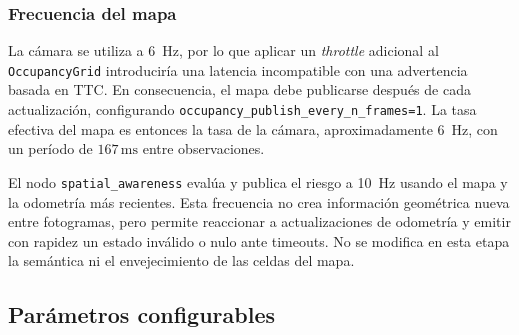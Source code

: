 \subsubsection{Frecuencia del mapa}

La cámara se utiliza a 6~Hz, por lo que aplicar un \emph{throttle} adicional
al \texttt{OccupancyGrid} introduciría una latencia incompatible con una
advertencia basada en TTC. En consecuencia, el mapa debe publicarse después de
cada actualización, configurando
\texttt{occupancy\_publish\_every\_n\_frames=1}. La tasa efectiva del mapa es
entonces la tasa de la cámara, aproximadamente 6~Hz, con un período de
$167\,\text{ms}$ entre observaciones.

El nodo \texttt{spatial\_awareness} evalúa y publica el riesgo a 10~Hz usando
el mapa y la odometría más recientes. Esta frecuencia no crea información
geométrica nueva entre fotogramas, pero permite reaccionar a actualizaciones
de odometría y emitir con rapidez un estado inválido o nulo ante timeouts. No
se modifica en esta etapa la semántica ni el envejecimiento de las celdas del
mapa.

\subsection{Parámetros configurables}
\label{subsec:sa-parameters}

